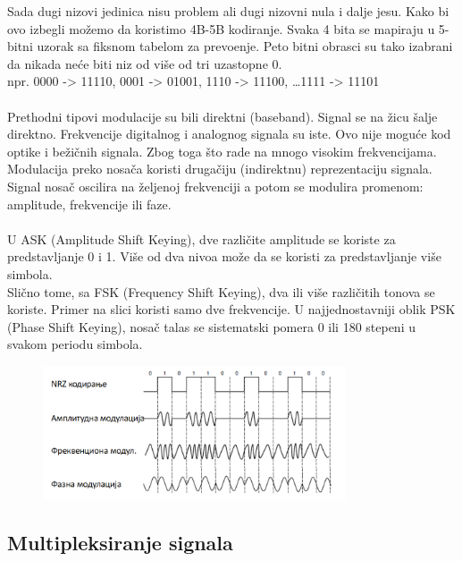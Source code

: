 \documentclass{article} %
\begin{document}
Sada dugi nizovi jedinica nisu problem ali dugi nizovni nula i dalje jesu. Kako bi ovo izbegli mo\v zemo da koristimo 4B-5B kodiranje.
Svaka 4 bita se mapiraju u 5-bitni uzorak sa fiksnom tabelom za prevo\dj  enje. Peto bitni obrasci su tako izabrani da nikada ne\' ce biti niz od vi\v se od tri uzastopne 0.
\\ npr. 0000 -> 11110, 0001 -> 01001, 1110 -> 11100, \dots 1111 -> 11101
\\ \\
Prethodni tipovi modulacije su bili direktni (baseband). Signal se na \v zicu \v salje direktno. Frekvencije digitalnog i analognog signala su iste. Ovo nije mogu\' ce kod optike i be\v zi\v cnih signala. Zbog toga \v sto rade na mnogo visokim frekvencijama. Modulacija preko nosa\v ca koristi druga\v ciju (indirektnu) reprezentaciju signala.
\\
Signal nosa\v c oscilira na \v zeljenoj frekvenciji a potom se modulira promenom: amplitude, frekvencije ili faze.
\\
\\
U ASK (Amplitude Shift Keying), dve razli\v cite amplitude se koriste za predstavljanje 0 i 1. Vi\v se od dva nivoa mo\v ze da se koristi za predstavljanje vi\v se simbola.
\\
Sli\v cno tome, sa FSK (Frequency Shift Keying), dva ili vi\v se razli\v citih tonova se koriste. Primer na slici koristi samo dve frekvencije. U najjednostavniji oblik PSK (Phase Shift Keying), nosa\v c talas se sistematski pomera 0 ili 180 stepeni u svakom periodu simbola.

\begin{figure}[H]
	\centering
	\includegraphics[width=0.8\textwidth]{slike-aplikativniSloj/passband.png}
\end{figure}

\subsection{Multipleksiranje signala}
\end{document}
